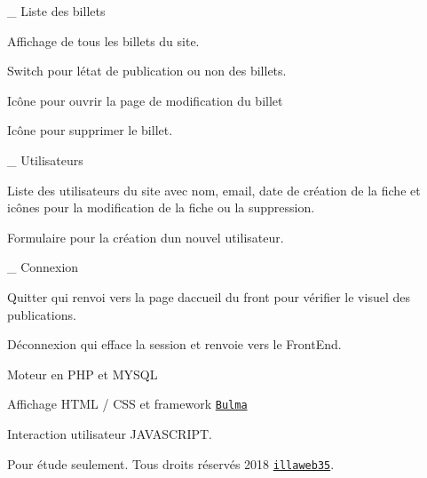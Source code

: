 \+\_\+ Liste des billets
\begin{DoxyItemize}
\item Affichage de tous les billets du site.
\item Switch pour l\textquotesingle{}état de publication ou non des billets.
\item Icône pour ouvrir la page de modification du billet
\item Icône pour supprimer le billet.
\end{DoxyItemize}

\+\_\+ Utilisateurs
\begin{DoxyItemize}
\item Liste des utilisateurs du site avec nom, email, date de création de la fiche et icônes pour la modification de la fiche ou la suppression.
\item Formulaire pour la création d\textquotesingle{}un nouvel utilisateur.
\end{DoxyItemize}

\+\_\+ Connexion
\begin{DoxyItemize}
\item Quitter qui renvoi vers la page d\textquotesingle{}accueil du front pour vérifier le visuel des publications.
\item Déconnexion qui efface la session et renvoie vers le Front\+End.
\end{DoxyItemize}



 Moteur en P\+HP et M\+Y\+S\+QL

Affichage H\+T\+ML / C\+SS et framework \href{https://bulma.io/}{\tt Bulma}

Interaction utilisateur J\+A\+V\+A\+S\+C\+R\+I\+PT.

Pour étude seulement. Tous droits réservés 2018 \href{https://www.illaweb.fr}{\tt illaweb35}. 